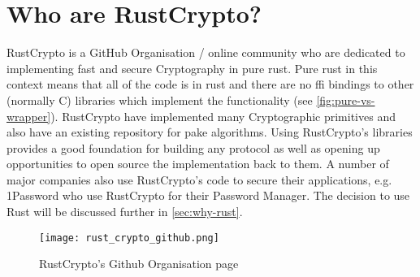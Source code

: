 \clearpage
\section{Who are RustCrypto?}
\label{sec:whom-rustcrypto}

RustCrypto is a GitHub Organisation / online community who are dedicated to implementing fast and secure Cryptography in pure rust.
Pure rust in this context means that all of the code is in rust and there are no \gls{ffi} bindings to other (normally C) libraries which implement the functionality (see \cref{fig:pure-vs-wrapper}).
RustCrypto have implemented many Cryptographic primitives and also have an existing repository for \gls{pake} algorithms.
Using RustCrypto's libraries provides a good foundation for building any protocol as well as opening up opportunities to open source the implementation back to them.
A number of major companies also use RustCrypto's code to secure their applications, e.g. 1Password who use RustCrypto for their Password Manager.
The decision to use Rust will be discussed further in \cref{sec:why-rust}.

\begin{figure}[H]
  \centering
  \texttt{[image: rust\_crypto\_github.png]}
  \caption{RustCrypto's Github Organisation page}
  \label{fig:rc-github}
\end{figure}


